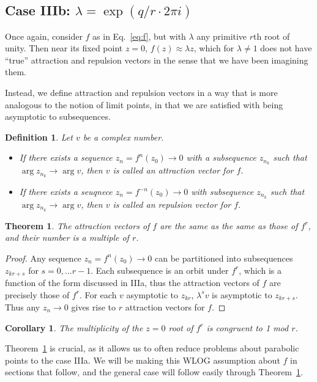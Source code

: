 \documentclass{article}
\newtheorem{thm}{Theorem}
\newtheorem{cor}{Corollary}
\newtheorem{dfn}{Definition}
\begin{document}
\subsection{Case IIIb: $\lambda = \exp(q/r \cdot 2\pi i)$}
Once again, consider $f$ as in Eq.~\ref{eq:f}, but with $\lambda$ any primitive $r$th root of unity. Then near its fixed point $z=0$, $f(z)\approx \lambda z$, which for $\lambda\ne 1$ does not have ``true'' attraction and repulsion vectors in the sense that we have been imagining them. 

Instead, we define attraction and repulsion vectors in a way that is more analogous to the notion of limit points, in that we are satisfied with being asymptotic to subsequences.

\begin{dfn}
   Let $v$ be a complex number. 
    \begin{itemize}
        \item If there exists a sequence $z_n=f^n(z_0)\to 0$ with a subsequence $z_{n_k}$ such that $\arg z_{n_k}\to\arg v$, then $v$ is called an attraction vector for $f$.
        \item If there exists a seuqnece $z_n=f^{-n}(z_0)\to 0$ with subsequence $z_{n_k}$ such that $\arg z_{n_k}\to\arg v$, then $v$ is called an repulsion vector for $f$.
    \end{itemize}
\end{dfn}
\begin{thm}
    \label{thm:arvec-rot}    
    The attraction vectors of $f$ are the same as the same as those of $f^r$, and their number is a multiple of $r$.
\end{thm}
\begin{proof}
    Any sequence $z_n=f^n(z_0)\to 0$ can be partitioned into subsequences $z_{kr+s}$ for $s=0,\dots r-1$. Each subsequence is an orbit under $f^r$, which is a function of the form discussed in IIIa, thus the attraction vectors of $f$ are precisely those of $f^r$. For each $v$ asymptotic to $z_{kr}$, $\lambda^s v$ is asymptotic to $z_{kr+s}$. Thus any $z_n\to 0$ gives rise to $r$ attraction vectors for $f$. 
\end{proof}
\begin{cor}
    \label{thm:rot-mult}
    The multiplicity of the $z=0$ root of $f^r$ is congruent to 1 mod $r$. 
\end{cor}
Theorem~\ref{thm:arvec-rot} is crucial, as it allows us to often reduce problems about parabolic points to the case IIIa. We will be making this WLOG assumption about $f$ in sections that follow, and the general case will follow easily through Theorem~\ref{thm:arvec-rot}.
\end{document}
